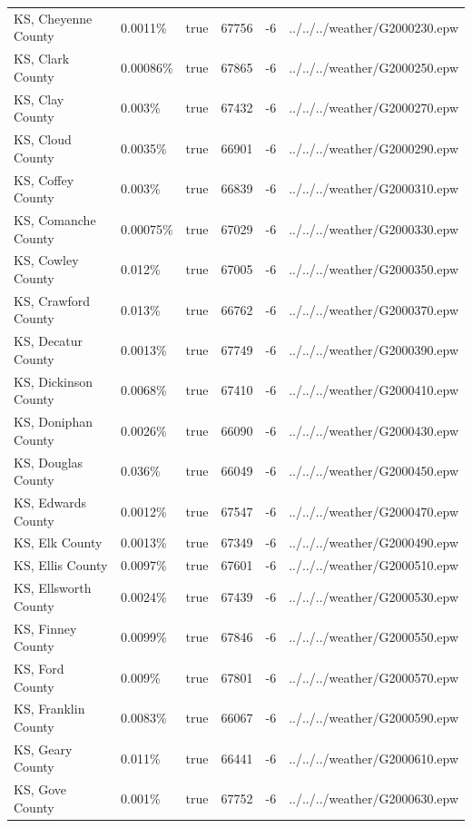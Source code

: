 \begin{longtable}[]{@{}llllll@{}}
KS, Cheyenne County & 0.0011\% & true & 67756 & -6 &
../../../weather/G2000230.epw \\
KS, Clark County & 0.00086\% & true & 67865 & -6 &
../../../weather/G2000250.epw \\
KS, Clay County & 0.003\% & true & 67432 & -6 &
../../../weather/G2000270.epw \\
KS, Cloud County & 0.0035\% & true & 66901 & -6 &
../../../weather/G2000290.epw \\
KS, Coffey County & 0.003\% & true & 66839 & -6 &
../../../weather/G2000310.epw \\
KS, Comanche County & 0.00075\% & true & 67029 & -6 &
../../../weather/G2000330.epw \\
KS, Cowley County & 0.012\% & true & 67005 & -6 &
../../../weather/G2000350.epw \\
KS, Crawford County & 0.013\% & true & 66762 & -6 &
../../../weather/G2000370.epw \\
KS, Decatur County & 0.0013\% & true & 67749 & -6 &
../../../weather/G2000390.epw \\
KS, Dickinson County & 0.0068\% & true & 67410 & -6 &
../../../weather/G2000410.epw \\
KS, Doniphan County & 0.0026\% & true & 66090 & -6 &
../../../weather/G2000430.epw \\
KS, Douglas County & 0.036\% & true & 66049 & -6 &
../../../weather/G2000450.epw \\
KS, Edwards County & 0.0012\% & true & 67547 & -6 &
../../../weather/G2000470.epw \\
KS, Elk County & 0.0013\% & true & 67349 & -6 &
../../../weather/G2000490.epw \\
KS, Ellis County & 0.0097\% & true & 67601 & -6 &
../../../weather/G2000510.epw \\
KS, Ellsworth County & 0.0024\% & true & 67439 & -6 &
../../../weather/G2000530.epw \\
KS, Finney County & 0.0099\% & true & 67846 & -6 &
../../../weather/G2000550.epw \\
KS, Ford County & 0.009\% & true & 67801 & -6 &
../../../weather/G2000570.epw \\
KS, Franklin County & 0.0083\% & true & 66067 & -6 &
../../../weather/G2000590.epw \\
KS, Geary County & 0.011\% & true & 66441 & -6 &
../../../weather/G2000610.epw \\
KS, Gove County & 0.001\% & true & 67752 & -6 &
../../../weather/G2000630.epw \\

\end{longtable}
